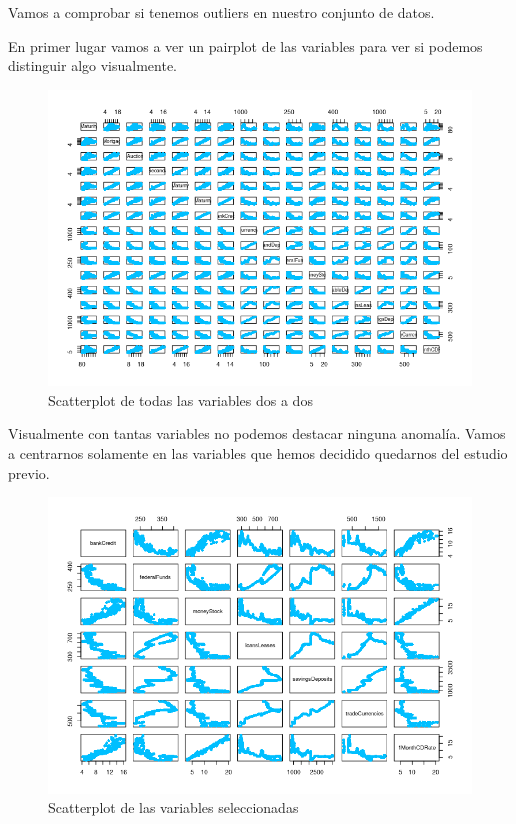 \documentclass[12pt,a4paper]{article}
\begin{document}
Vamos a comprobar si tenemos outliers en nuestro conjunto de datos.

En primer lugar vamos a ver un pairplot de las variables para ver si podemos distinguir algo visualmente.

\begin{figure}[H]
	\centering
	\includegraphics[scale=0.95]{./Imagenes/EDA/Regresion/pairplot_todas.png}
	\caption{Scatterplot de todas las variables dos a dos}
\end{figure}

Visualmente con tantas variables no podemos destacar ninguna anomalía. Vamos a centrarnos solamente en las variables que hemos decidido quedarnos del estudio previo.

\begin{figure}[H]
	\centering
	\includegraphics[scale=0.95]{./Imagenes/EDA/Regresion/pairplot_variables_seleccionadas.png}
	\caption{Scatterplot de las variables seleccionadas}
\end{figure}
\end{document}
